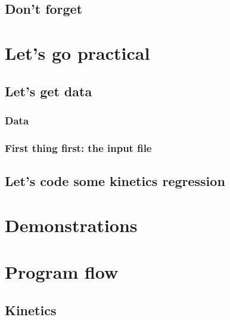 \documentclass[twoside]{report}
\begin{document}
\section{\GRVY}

\section{Don't forget \Doxygen}
\label{dox}


\chapter{Let's go practical}
\chaptermark{\ANTIOCHPrac}
\label{Antioch:practice}

\section{Let's get data}

\subsection{Data}
\label{kin:data}


\subsection{First thing first: the input file}

\clearpage

\section{Let's code some kinetics regression}


\appendix
\chapter{Demonstrations}
\label{demo}


\chapter{Program flow}
\label{progflow}

\section{Kinetics}
\label{progflow:kinetics}

\end{document}
